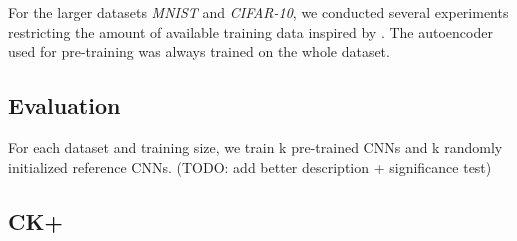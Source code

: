 \documentclass[draft]{article}
\begin{document}
    For the larger datasets \emph{MNIST} and \emph{CIFAR-10}, we conducted several experiments restricting the amount of available training data inspired by \citep{masci11}. The autoencoder used for pre-training was always trained on the whole dataset. 


  \subsection{Evaluation}
    For each dataset and training size, we train k pre-trained CNNs and k randomly initialized reference CNNs.
    (TODO: add better description + significance test)

  \subsection{CK+}
\end{document}
